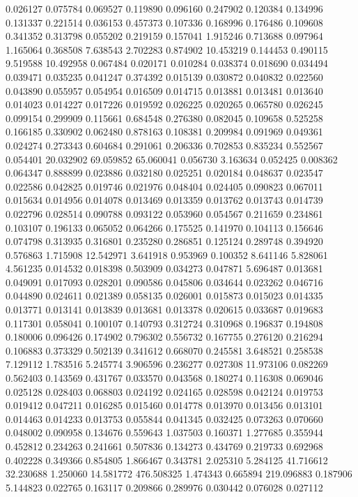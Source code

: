 0.026127
0.075784
0.069527
0.119890
0.096160
0.247902
0.120384
0.134996
0.131337
0.221514
0.036153
0.457373
0.107336
0.168996
0.176486
0.109608
0.341352
0.313798
0.055202
0.219159
0.157041
1.915246
0.713688
0.097964
1.165064
0.368508
7.638543
2.702283
0.874902
10.453219
0.144453
0.490115
9.519588
10.492958
0.067484
0.020171
0.010284
0.038374
0.018690
0.034494
0.039471
0.035235
0.041247
0.374392
0.015139
0.030872
0.040832
0.022560
0.043890
0.055957
0.054954
0.016509
0.014715
0.013881
0.013481
0.013640
0.014023
0.014227
0.017226
0.019592
0.026225
0.020265
0.065780
0.026245
0.099154
0.299909
0.115661
0.684548
0.276380
0.082045
0.109658
0.525258
0.166185
0.330902
0.062480
0.878163
0.108381
0.209984
0.091969
0.049361
0.024274
0.273343
0.604684
0.291061
0.206336
0.702853
0.835234
0.552567
0.054401
20.032902
69.059852
65.060041
0.056730
3.163634
0.052425
0.008362
0.064347
0.888899
0.023886
0.032180
0.025251
0.020184
0.048637
0.023547
0.022586
0.042825
0.019746
0.021976
0.048404
0.024405
0.090823
0.067011
0.015634
0.014956
0.014078
0.013469
0.013359
0.013762
0.013743
0.014739
0.022796
0.028514
0.090788
0.093122
0.053960
0.054567
0.211659
0.234861
0.103107
0.196133
0.065052
0.064266
0.175525
0.141970
0.104113
0.156646
0.074798
0.313935
0.316801
0.235280
0.286851
0.125124
0.289748
0.394920
0.576863
1.715908
12.542971
3.641918
0.953969
0.100352
8.641146
5.828061
4.561235
0.014532
0.018398
0.503909
0.034273
0.047871
5.696487
0.013681
0.049091
0.017093
0.028201
0.090586
0.045806
0.034644
0.023262
0.046716
0.044890
0.024611
0.021389
0.058135
0.026001
0.015873
0.015023
0.014335
0.013771
0.013141
0.013839
0.013681
0.013378
0.020615
0.033687
0.019683
0.117301
0.058041
0.100107
0.140793
0.312724
0.310968
0.196837
0.194808
0.180006
0.096426
0.174902
0.796302
0.556732
0.167755
0.276120
0.216294
0.106883
0.373329
0.502139
0.341612
0.668070
0.245581
3.648521
0.258538
7.129112
1.783516
5.245774
3.906596
0.236277
0.027308
11.973106
0.082269
0.562403
0.143569
0.431767
0.033570
0.043568
0.180274
0.116308
0.069046
0.025128
0.028403
0.068803
0.024192
0.024165
0.028598
0.042124
0.019753
0.019412
0.047211
0.016285
0.015460
0.014778
0.013970
0.013456
0.013101
0.014463
0.014233
0.013753
0.055844
0.041345
0.032425
0.073263
0.070660
0.048002
0.090958
0.134676
0.559643
1.037503
0.160371
1.277685
0.355944
0.452812
0.234263
0.241661
0.507836
0.134273
0.434769
0.219733
0.692968
0.402228
0.349366
0.854805
1.866467
0.343781
2.025310
5.284125
41.716612
32.230688
1.250060
14.581772
476.508325
1.474343
0.665894
219.096883
0.187906
5.144823
0.022765
0.163117
0.209866
0.289976
0.030442
0.076028
0.027112
